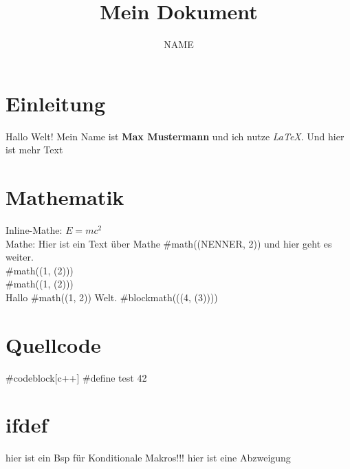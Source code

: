\documentclass{article}
\title{Mein Dokument}
\author{NAME}
\begin{document}
\maketitle

\section{Einleitung}
Hallo Welt! 
Mein Name ist \textbf{Max Mustermann} und ich nutze \textit{LaTeX}.
Und hier ist mehr Text

\section{Mathematik}
Inline-Mathe: $E = mc^2$  \\
Mathe: Hier ist ein Text über Mathe #math(\frac(NENNER, 2)) und hier geht es weiter.\\  

#math(\frac(1, \sqrt(2))) \\

#math(\pow(1, \sqrt(2))) \\

Hallo #math(\frac(1, 2)) Welt.  
#blockmath(\sqrt(\frac(4, \abs(3))))

\section{Quellcode}

#codeblock[c++]{
#define test 42
}


\section{ifdef}
hier ist ein Bsp für Konditionale Makros!!!
\else
hier ist eine Abzweigung
\endif
\end{document}
